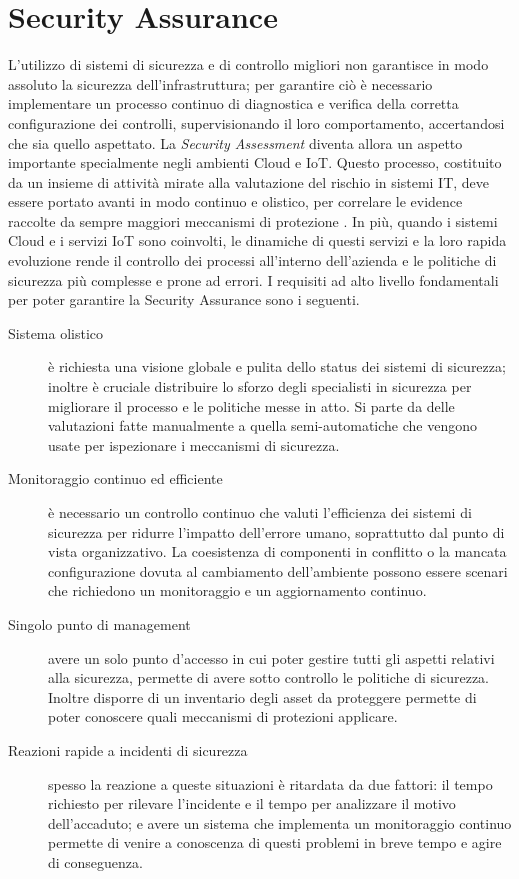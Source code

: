\section{Security Assurance}
L'utilizzo di sistemi di sicurezza e di controllo migliori non garantisce in modo assoluto la sicurezza dell'infrastruttura; 
per garantire ciò è necessario implementare un processo continuo di diagnostica e verifica della corretta configurazione dei controlli, 
supervisionando il loro comportamento, accertandosi che sia quello aspettato. \vspace{0.5 cm}\hfill\break
La \textit{Security Assessment} diventa allora un aspetto importante specialmente negli ambienti Cloud e IoT. Questo processo, costituito
da un insieme di attività mirate alla valutazione del rischio in sistemi IT, deve essere portato avanti in modo continuo e olistico, per 
correlare le evidence raccolte da sempre maggiori meccanismi di protezione \cite{mooncloud-semi-automatic-and-trustworthy}.\hfill\break
In più, quando i sistemi Cloud e i servizi IoT sono coinvolti, le dinamiche di questi servizi e la loro rapida evoluzione rende il 
controllo dei processi all'interno dell'azienda e le politiche di sicurezza più complesse e prone ad errori. \vspace{0.5 cm}\hfill\break
I requisiti ad alto livello fondamentali per poter garantire la Security Assurance sono i seguenti.
\begin{description}
    \item[Sistema olistico] è richiesta una visione globale e pulita dello status dei sistemi di sicurezza; inoltre è cruciale 
    distribuire lo sforzo degli specialisti in sicurezza per migliorare il processo e le politiche messe in atto. Si parte da 
    delle valutazioni fatte manualmente a quella semi-automatiche che vengono usate per ispezionare i meccanismi di sicurezza. 
    \item[Monitoraggio continuo ed efficiente] è necessario un controllo continuo che valuti l'efficienza dei sistemi di sicurezza 
    per ridurre l'impatto dell'errore umano, soprattutto dal punto di vista organizzativo. La coesistenza di componenti in conflitto o
    la mancata configurazione dovuta al cambiamento dell'ambiente possono essere scenari che richiedono un monitoraggio e un 
    aggiornamento continuo.
    \item[Singolo punto di management] avere un solo punto d'accesso in cui poter gestire tutti gli aspetti relativi alla sicurezza, 
    permette di avere sotto controllo le politiche di sicurezza. Inoltre disporre di un inventario degli asset da proteggere permette di
    poter conoscere quali meccanismi di protezioni applicare.
    \item[Reazioni rapide a incidenti di sicurezza] spesso la reazione a queste situazioni è ritardata da due fattori: il tempo 
    richiesto per rilevare l'incidente e il tempo per analizzare il motivo dell'accaduto; e avere un sistema che implementa un monitoraggio
    continuo permette di venire a conoscenza di questi problemi in breve tempo e agire di conseguenza.
    \label{list:security-assurance-fondamentals}
\end{description}
%
